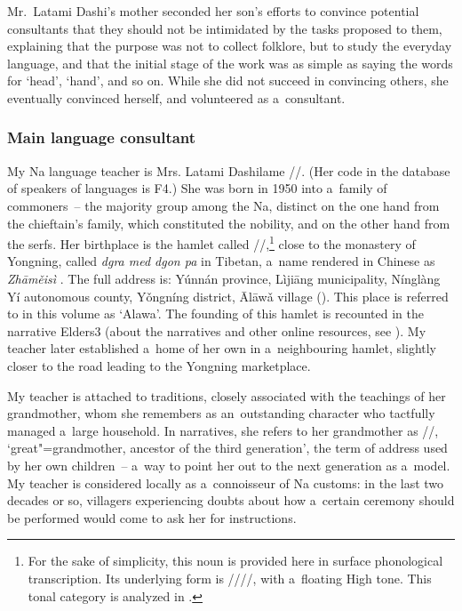 Mr.\ Latami Dashi’s mother seconded her son’s efforts to convince potential consultants that they
should not be intimidated by the tasks proposed to them, explaining that the purpose was not to
collect folklore, but to study the everyday language, and that the initial stage of the work was as
simple as saying the words for ‘head’, ‘hand’, and so on. While she did not succeed in convincing
others, she eventually convinced herself, and volunteered as a~consultant.


\subsubsection{Main language consultant}
\label{sec:mainlanguageconsultantmrs}
\largerpage

My Na language teacher is Mrs. Latami Dashilame //. (Her code in the database of speakers of  languages is F4.) She was born in
1950 into a~family of commoners~-- the majority group among the Na, distinct on the one hand from the chieftain's family, which constituted the nobility, and on the other hand from the serfs. Her birthplace is the hamlet called //,\footnote{For the sake of simplicity, this noun is provided here in surface phonological transcription. Its underlying form is ////, with a~{floating} High tone. This tonal category is analyzed in .} close to the monastery of Yongning, called
\textit{dgra med dgon pa} in {Tibetan}, a~name rendered in Chinese as \textit{Zhāměisì} . The
full address is: Yúnnán province, Lìjiāng municipality, Nínglàng Yí
autonomous county, Yǒngníng district, Ālāwǎ 
village (). This place is referred to in this volume as ‘Alawa'.
The founding of this hamlet is recounted in the narrative Elders3 (about the narratives and other online resources, see ). My teacher later established a~home of her own in a~neighbouring hamlet, slightly closer to
the road leading to the Yongning marketplace.

My teacher is attached to traditions, closely associated with the teachings of her grandmother, whom
she remembers as an~outstanding character who tactfully managed a~large household. In narratives,
she refers to her grandmother as //, ‘great"=grandmother, ancestor of the third
generation’, the {term of address} used by her own children~-- a~way to point her out to the next
generation as a~model. My teacher is considered locally as a~connoisseur of Na customs: in the last two decades or so, villagers experiencing doubts about how a~certain ceremony should be
performed would come to ask her for instructions.

